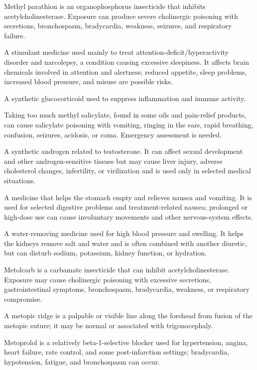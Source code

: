 Methyl parathion is an organophosphorus insecticide that inhibits acetylcholinesterase. Exposure can produce severe cholinergic poisoning with secretions, bronchospasm, bradycardia, weakness, seizures, and respiratory failure.

 A stimulant medicine used mainly to treat attention-deficit/hyperactivity disorder and narcolepsy, a condition causing excessive sleepiness. It affects brain chemicals involved in attention and alertness; reduced appetite, sleep problems, increased blood pressure, and misuse are possible risks.

 A synthetic glucocorticoid used to suppress inflammation and immune activity.

 Taking too much methyl salicylate, found in some oils and pain-relief products, can cause salicylate poisoning with vomiting, ringing in the ears, rapid breathing, confusion, seizures, acidosis, or coma. Emergency assessment is needed.

 A synthetic androgen related to testosterone. It can affect sexual development and other androgen-sensitive tissues but may cause liver injury, adverse cholesterol changes, infertility, or virilization and is used only in selected medical situations.

 A medicine that helps the stomach empty and relieves nausea and vomiting. It is used for selected digestive problems and treatment-related nausea; prolonged or high-dose use can cause involuntary movements and other nervous-system effects.

 A water-removing medicine used for high blood pressure and swelling. It helps the kidneys remove salt and water and is often combined with another diuretic, but can disturb sodium, potassium, kidney function, or hydration.

 Metolcarb is a carbamate insecticide that can inhibit acetylcholinesterase. Exposure may cause cholinergic poisoning with excessive secretions, gastrointestinal symptoms, bronchospasm, bradycardia, weakness, or respiratory compromise.

 A metopic ridge is a palpable or visible line along the forehead from fusion of the metopic suture; it may be normal or associated with trigonocephaly.

 Metoprolol is a relatively beta-1-selective blocker used for hypertension, angina, heart failure, rate control, and some post-infarction settings; bradycardia, hypotension, fatigue, and bronchospasm can occur.

